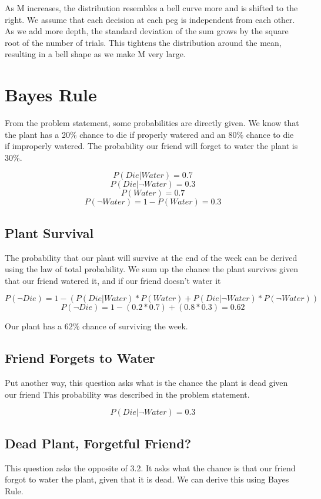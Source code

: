 \documentclass{article}
\begin{document}
As M increases, the distribution resembles a bell curve more and is shifted to the right. We assume that each decision at each peg is independent from each other. As we add more depth, the standard deviation of the sum grows by the square root of the number of trials. This tightens the distribution around the mean, resulting in a bell shape as we make M very large.

\newpage
\section{Bayes Rule}

From the problem statement, some probabilities are directly given. We know that the plant has a 20\% chance to die if properly watered and an 80\% chance to die if improperly watered. The probability our friend will forget to water the plant is 30\%.

\[P(Die | Water) = 0.7\]
\[P(Die | \neg Water) = 0.3\]
\[P(Water) = 0.7\]
\[P(\neg Water) = 1 - P(Water) = 0.3\]

\subsection{Plant Survival}
The probability that our plant will survive at the end of the week can be derived using the law of total probability. We sum up the chance the plant survives given that our friend watered it, and if our friend doesn't water it

\[P(\neg Die) = 1 - ( P(Die | Water) * P(Water) + P(Die | \neg Water) * P(\neg Water) ) \]
\[P(\neg Die) = 1 - (0.2*0.7) + (0.8*0.3) = 0.62 \]

\noindent
Our plant has a 62\% chance of surviving the week.

\subsection{Friend Forgets to Water}
Put another way, this question asks what is the chance the plant is dead given our friend  This probability was described in the problem statement.

\[P(Die | \neg Water) = 0.3\]

\subsection{Dead Plant, Forgetful Friend?}
This question asks the opposite of 3.2. It asks what the chance is that our friend forgot to water the plant, given that it is dead. We can derive this using Bayes Rule.
\end{document}
